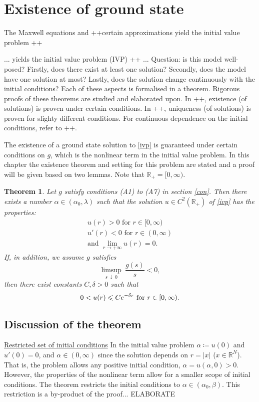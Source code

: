 \newtheorem{thmx}{Theorem}
\renewcommand{\thethmx}{\Alph{thmx}}
\section{Existence of ground state}
The Maxwell equations and ++certain approximations yield the initial value problem ++   

... yields the initial value problem (IVP) ++ ... Question: is this model well-posed? Firstly, does there exist at least one solution? Secondly, does the model have one solution at most? Lastly, does the solution change continuously with the initial conditions? Each of these aspects is formalised in a theorem. Rigorous proofs of these theorems are studied and elaborated upon. In ++, existence (of solutions) is proven under certain conditions. In ++, uniqueness (of solutions) is proven for slighty different conditions. For continuous dependence on the initial conditions, refer to ++.

The existence of a ground state solution to \eqref{ivp} is guaranteed under certain conditions on $g$, which is the nonlinear term in the initial value problem. In this chapter the existence theorem and setting for this problem are stated and a proof will be given based on two lemmas. Note that $\mathbb{R}_+=[0,\infty)$.

\begin{thmx}\label{exithm}
Let $g$ satisfy conditions (A1) to (A7) in section \ref{con}. Then there exists a number $\alpha\in(\alpha_0,\lambda)$ such that the solution $u\in C^2(\mathbb{R}_+)$ of \eqref{ivp} has the properties: \begin{gather*}u(r)>0\text{ for }r\in[0,\infty)\\u'(r)<0\text{ for }r\in(0,\infty)\\ \text{and }\lim_{r\to+\infty}u(r)=0.\end{gather*} If, in addition, we assume $g$ satisfies $$\limsup_{s~\downarrow~0}~\frac{g(s)}{s}<0,$$ then there exist constants $C,\delta>0$ such that $$0<u(r)\leq Ce^{-\delta r} ~~ \textnormal{for} ~ r\in[0,\infty).$$
\end{thmx}

\subsection{Discussion of the theorem}\hfill

\underline{Restricted set of initial conditions} In the initial value problem $\alpha\coloneqq u(0)$ and $u'(0)=0$, and $\alpha\in(0,\infty)$ since the solution depends on $r=|x|$ ($x\in\mathbb{R}^N$). That is, the problem allows any positive initial condition, $\alpha=u(\alpha,0)>0$. However, the properties of the nonlinear term allow for a smaller scope of initial conditions. The theorem restricts the initial conditions to $\alpha\in(\alpha_0,\beta)$. This restriction is a by-product of the proof... {\color{red} ELABORATE}

